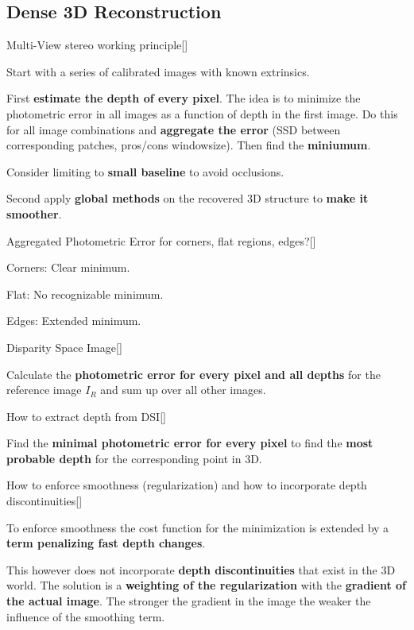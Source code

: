 \documentclass[10pt,a4paper]{scrartcl}
\begin{document}
\begin{multicols*}{2}
\subsection*{Dense 3D Reconstruction}

\begin{QandA}
{Multi-View stereo working principle}[\Derivation]
\item Start with a series of calibrated images with known extrinsics.
\item First \textbf{estimate the depth of every pixel}. The idea is to minimize the photometric error in all images as a function of depth in the first image. Do this for all image combinations and \textbf{aggregate the error} (SSD between corresponding patches, pros/cons windowsize). Then find the \textbf{miniumum}.
\item Consider limiting to \textbf{small baseline} to avoid occlusions.
\item Second apply \textbf{global methods} on the recovered 3D structure to \textbf{make it smoother}.
\end{QandA}

\begin{QandA}{Aggregated Photometric Error for corners, flat regions, edges?}[\Comparison]
\item Corners: Clear minimum.
\item Flat: No recognizable minimum.
\item Edges: Extended minimum.
\end{QandA}

\begin{QandA}{Disparity Space Image}[\Definition]
\item Calculate the \textbf{photometric error for every pixel and all depths} for the reference image $I_R$ and sum up over all other images.
\end{QandA}

\begin{QandA}{How to extract depth from DSI}[\Application]
\item Find the \textbf{minimal photometric error for every pixel} to find the \textbf{most probable depth} for the corresponding point in 3D.
\end{QandA}

\begin{QandA}{How to enforce smoothness (regularization) and how to incorporate depth discontinuities}[\Derivation]
\item To enforce smoothness the cost function for the minimization is extended by a \textbf{term penalizing fast depth changes}.
\item This however does not incorporate \textbf{depth discontinuities} that exist in the 3D world. The solution is a \textbf{weighting of the regularization} with the \textbf{gradient of the actual image}. The stronger the gradient in the image the weaker the influence of the smoothing term.
\end{QandA}


\end{multicols*}
\end{document}
